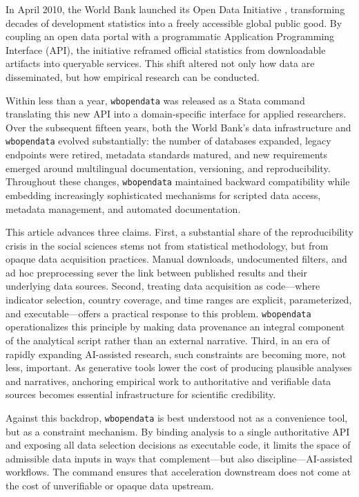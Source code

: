 \documentclass[bib]{statapress}
\begin{document}
In April 2010, the World Bank launched its Open Data Initiative \citep{worldbank2010opendata},
transforming decades of development statistics into a freely accessible global public good.
By coupling an open data portal with a programmatic Application Programming Interface (API),
the initiative reframed official statistics from downloadable artifacts into queryable services.
This shift altered not only how data are disseminated, but how empirical research can be
conducted.

Within less than a year, \texttt{wbopendata} \citep{azevedo2011wbopendata} was released as a
Stata command translating this new API into a domain-specific interface for applied researchers.
Over the subsequent fifteen years, both the World Bank’s data infrastructure and
\texttt{wbopendata} evolved substantially: the number of databases expanded, legacy endpoints
were retired, metadata standards matured, and new requirements emerged around multilingual
documentation, versioning, and reproducibility. Throughout these changes, \texttt{wbopendata}
maintained backward compatibility while embedding increasingly sophisticated mechanisms for
scripted data access, metadata management, and automated documentation.

This article advances three claims. First, a substantial share of the reproducibility crisis in
the social sciences stems not from statistical methodology, but from opaque data acquisition
practices. Manual downloads, undocumented filters, and ad hoc preprocessing sever the link
between published results and their underlying data sources. Second, treating data acquisition
as code—where indicator selection, country coverage, and time ranges are explicit,
parameterized, and executable—offers a practical response to this problem. \texttt{wbopendata}
operationalizes this principle by making data provenance an integral component of the analytical
script rather than an external narrative. Third, in an era of rapidly expanding AI-assisted
research, such constraints are becoming more, not less, important. As generative tools lower the
cost of producing plausible analyses and narratives, anchoring empirical work to authoritative
and verifiable data sources becomes essential infrastructure for scientific credibility.

Against this backdrop, \texttt{wbopendata} is best understood not as a convenience tool, but as a
constraint mechanism. By binding analysis to a single authoritative API and exposing all data
selection decisions as executable code, it limits the space of admissible data inputs in ways
that complement—but also discipline—AI-assisted workflows. The command ensures that acceleration
downstream does not come at the cost of unverifiable or opaque data upstream.
\end{document}
